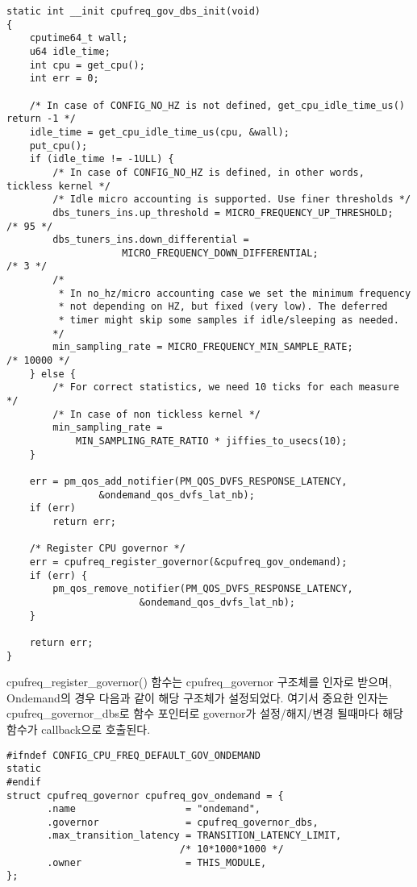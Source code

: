 \begin{lstlisting}
static int __init cpufreq_gov_dbs_init(void)
{
    cputime64_t wall;
    u64 idle_time;
    int cpu = get_cpu();
    int err = 0;

    /* In case of CONFIG_NO_HZ is not defined, get_cpu_idle_time_us() return -1 */
    idle_time = get_cpu_idle_time_us(cpu, &wall);
    put_cpu();
    if (idle_time != -1ULL) {
        /* In case of CONFIG_NO_HZ is defined, in other words, tickless kernel */
        /* Idle micro accounting is supported. Use finer thresholds */
        dbs_tuners_ins.up_threshold = MICRO_FREQUENCY_UP_THRESHOLD;   /* 95 */
        dbs_tuners_ins.down_differential =
                    MICRO_FREQUENCY_DOWN_DIFFERENTIAL;                /* 3 */
        /*
         * In no_hz/micro accounting case we set the minimum frequency
         * not depending on HZ, but fixed (very low). The deferred
         * timer might skip some samples if idle/sleeping as needed.
        */
        min_sampling_rate = MICRO_FREQUENCY_MIN_SAMPLE_RATE;          /* 10000 */
    } else {
        /* For correct statistics, we need 10 ticks for each measure */
        /* In case of non tickless kernel */
        min_sampling_rate =
            MIN_SAMPLING_RATE_RATIO * jiffies_to_usecs(10);
    }

    err = pm_qos_add_notifier(PM_QOS_DVFS_RESPONSE_LATENCY,
                &ondemand_qos_dvfs_lat_nb);
    if (err)
        return err;

    /* Register CPU governor */
    err = cpufreq_register_governor(&cpufreq_gov_ondemand);
    if (err) {
        pm_qos_remove_notifier(PM_QOS_DVFS_RESPONSE_LATENCY,
                       &ondemand_qos_dvfs_lat_nb);
    }

    return err;
}
\end{lstlisting}

\vspace{\baselineskip}

cpufreq\_register\_governor() 함수는 cpufreq\_governor 구조체를 인자로 받으며, Ondemand의 경우 다음과 같이 해당 구조체가 설정되었다. 
여기서 중요한 인자는 cpufreq\_governor\_dbs로 함수 포인터로 governor가 설정/해지/변경 될때마다 해당 함수가 callback으로 호출된다. 
\begin{lstlisting}
#ifndef CONFIG_CPU_FREQ_DEFAULT_GOV_ONDEMAND
static
#endif
struct cpufreq_governor cpufreq_gov_ondemand = {
       .name                   = "ondemand",
       .governor               = cpufreq_governor_dbs,
       .max_transition_latency = TRANSITION_LATENCY_LIMIT,  
                              /* 10*1000*1000 */
       .owner                  = THIS_MODULE,
};
\end{lstlisting}


